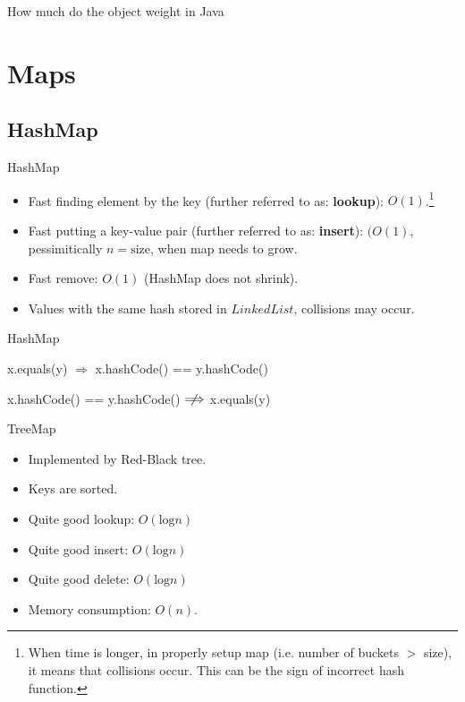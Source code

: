 \documentclass{beamer}
\begin{document}
\lstset{style=srcnormal}
\begin{frame}[fragile]{How much do the object weight in Java}
    
\end{frame}

\section{Maps}
\subsection{HashMap}
\begin{frame}{HashMap}

\begin{itemize}
	\item Fast finding element by the key (further referred to as: \textbf{lookup}): $O(1)$.\footnote{When time is longer, in properly setup map (i.e. number of buckets $>$ size), it means that collisions occur. This can be the sign of incorrect hash function.}
    \item Fast putting a key-value pair (further referred to as: \textbf{insert}): $(O(1)$, pessimitically $n=\textrm{size}$, when map needs to grow.
    \item Fast remove: $O(1)$ (HashMap does not shrink).
    \item Values with the same hash stored in $LinkedList$, collisions may occur.
\end{itemize}
\end{frame}

\begin{frame}{HashMap}

\begin{center}x.equals(y) $\Longrightarrow$ x.hashCode() == y.hashCode()\end{center}
\begin{center}x.hashCode() == y.hashCode()  $\centernot\Longrightarrow$ x.equals(y)\end{center}
\end{frame}


\begin{frame}{TreeMap}

\begin{itemize}
	\item Implemented by Red-Black tree.
    \item Keys are sorted.
    \item Quite good lookup: $O(\textrm{log}n)$
    \item Quite good insert: $O(\textrm{log}n)$
    \item Quite good delete: $O(\textrm{log}n)$
    \item Memory consumption: $O(n)$.
\end{itemize}
\end{frame}
\end{document}
